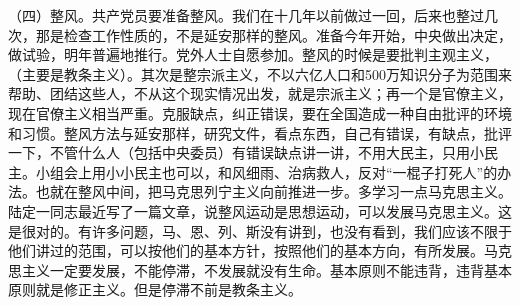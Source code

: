 （四）整风。共产党员要准备整风。我们在十几年以前做过一回，后来也整过几次，那是检查工作性质的，不是延安那样的整风。准备今年开始，中央做出决定，做试验，明年普遍地推行。党外人士自愿参加。整风的时候是要批判主观主义，（主要是教条主义）。其次是整宗派主义，不以六亿人口和500万知识分子为范围来帮助、团结这些人，不从这个现实情况出发，就是宗派主义；再一个是官僚主义，现在官僚主义相当严重。克服缺点，纠正错误，要在全国造成一种自由批评的环境和习惯。整风方法与延安那样，研究文件，看点东西，自己有错误，有缺点，批评一下，不管什么人（包括中央委员）有错误缺点讲一讲，不用大民主，只用小民主。小组会上用小小民主也可以，和风细雨、治病救人，反对“一棍子打死人”的办法。也就在整风中间，把马克思列宁主义向前推进一步。多学习一点马克思主义。陆定一同志最近写了一篇文章，说整风运动是思想运动，可以发展马克思主义。这是很对的。有许多问题，马、恩、列、斯没有讲到，也没有看到，我们应该不限于他们讲过的范围，可以按他们的基本方针，按照他们的基本方向，有所发展。马克思主义一定要发展，不能停滞，不发展就没有生命。基本原则不能违背，违背基本原则就是修正主义。但是停滞不前是教条主义。

